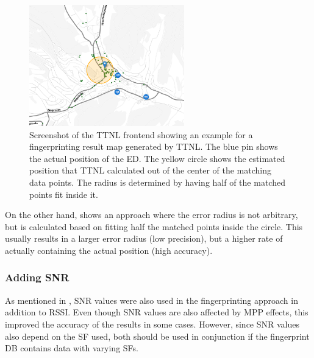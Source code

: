 \begin{figure}[htbp]
    \centering
    \includegraphics[width=0.6\textwidth]{pictures/ttn-locator/frontend/fingerprinting/rssi_similarity_map_example_dynamic_radius.png}
    \caption[Example for a fingerprinting result map generated by \acl{TTNL} with \acl{RSS} values only]{
        Screenshot of the \ac{TTNL} frontend showing an example for a fingerprinting result map generated by \ac{TTNL}.
        The blue pin shows the actual position of the \acl{ED}.
        The yellow circle shows the estimated position that \ac{TTNL} calculated out of the center of the matching data points.
        The radius is determined by having half of the matched points fit inside it.
    }\label{fig:fingerprinting-map-example-dynamic-radius}
\end{figure}

On the other hand,  shows an approach where the error radius is not arbitrary, but is calculated based on fitting half the matched points inside the circle.
This usually results in a larger error radius (low precision), but a higher rate of actually containing the actual position (high accuracy).

\subsubsection{Adding \acl{SNR}}


As mentioned in , \ac{SNR} values were also used in the fingerprinting approach in addition to \ac{RSSI}.
Even though \ac{SNR} values are also affected by \ac{MPP} effects, this improved the accuracy of the results in some cases.
However, since \ac{SNR} values also depend on the \ac{SF} used, both should be used in conjunction if the fingerprint \ac{DB} contains data with varying \acp{SF}.

